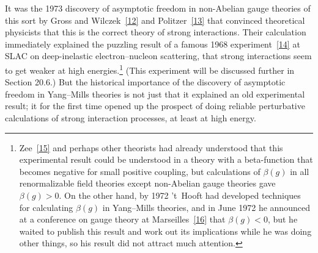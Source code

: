 It was the 1973 discovery of asymptotic freedom in non-Abelian gauge theories of this sort by Gross and Wilczek~\hyperref[ch18-ref-12]{[12]} and Politzer~\hyperref[ch18-ref-13]{[13]} that convinced theoretical physicists that this is the correct theory of strong interactions. Their calculation immediately explained the puzzling result of a famous 1968 experiment~\hyperref[ch18-ref-14]{[14]} at SLAC on deep-inelastic electron--nucleon scattering, that strong interactions seem to get weaker at high energies.\footnote{Zee~\hyperref[ch18-ref-15]{[15]} and perhaps other theorists had already understood that this experimental result could be understood in a theory with a beta-function that becomes negative for small positive coupling, but calculations of $\beta(g)$ in all renormalizable field theories except non-Abelian gauge theories gave $\beta(g)>0$. On the other hand, by 1972 't~Hooft had developed techniques for calculating $\beta(g)$ in Yang--Mills theories, and in June 1972 he announced at a conference on gauge theory at Marseilles~\hyperref[ch18-ref-16]{[16]} that $\beta(g)<0$, but he waited to publish this result and work out its implications while he was doing other things, so his result did not attract much attention.} (This experiment will be discussed further in Section 20.6.) But the historical importance of the discovery of asymptotic freedom in Yang--Mills theories is not just that it explained an old experimental result; it for the first time opened up the prospect of doing reliable perturbative calculations of strong interaction processes, at least at high energy.


